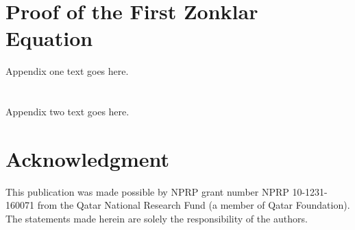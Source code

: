 \documentclass[journal,comsoc]{IEEEtran}
\begin{document}
%


\appendices
\section{Proof of the First Zonklar Equation}
Appendix one text goes here.

\section{}
Appendix two text goes here.


\section*{Acknowledgment}
%
This publication was made possible by NPRP grant number NPRP 10-1231-160071 from the Qatar National Research Fund (a member of Qatar Foundation). The statements made herein are solely the responsibility of the authors.


\ifCLASSOPTIONcaptionsoff
  \newpage
\fi





%
%
%

% 

\end{document}
